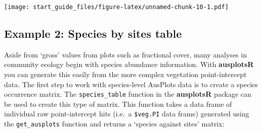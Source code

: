 \documentclass[
]{article}
\newenvironment{Shaded}{\begin{snugshade}}{\end{snugshade}}
\newcommand{\CommentTok}[1]{\textcolor[rgb]{0.56,0.35,0.01}{\textit{#1}}}
\newcommand{\DataTypeTok}[1]{\textcolor[rgb]{0.13,0.29,0.53}{#1}}
\newcommand{\DecValTok}[1]{\textcolor[rgb]{0.00,0.00,0.81}{#1}}
\newcommand{\KeywordTok}[1]{\textcolor[rgb]{0.13,0.29,0.53}{\textbf{#1}}}
\newcommand{\NormalTok}[1]{#1}
\newcommand{\OperatorTok}[1]{\textcolor[rgb]{0.81,0.36,0.00}{\textbf{#1}}}
\newcommand{\StringTok}[1]{\textcolor[rgb]{0.31,0.60,0.02}{#1}}
\begin{document}
\texttt{[image: start\_guide\_files/figure-latex/unnamed-chunk-10-1.pdf]}

\hypertarget{example-2-species-by-sites-table}{%
\subsection{Example 2: Species by sites
table}\label{example-2-species-by-sites-table}}

Aside from `gross' values from plots such as fractional cover, many
analyses in community ecology begin with species abundance information.
With \textbf{ausplotsR} you can generate this easily from the more
complex vegetation point-intercept data. The first step to work with
species-level AusPlots data is to create a species occurrence matrix.
The \texttt{species\_table} function in the \textbf{ausplotsR} package
can be used to create this type of matrix. This function takes a data
frame of individual raw point-intercept hits (i.e.~a \texttt{\$veg.PI}
data frame) generated using the \texttt{get\_ausplots} function and
returns a `species against sites' matrix:

\begin{Shaded}
\end{Shaded}
\end{document}
